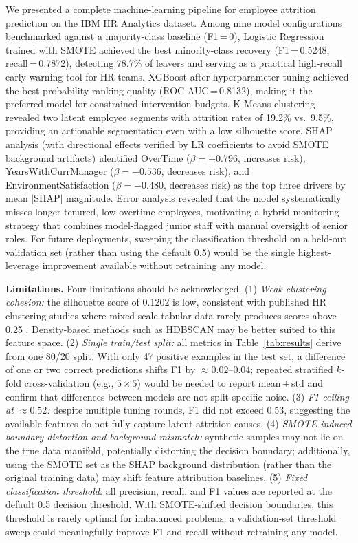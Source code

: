 \documentclass{article}
\begin{document}
We presented a complete machine-learning pipeline for employee attrition
prediction on the IBM HR Analytics dataset. Among nine model configurations
benchmarked against a majority-class baseline (F1\,=\,0), Logistic
Regression trained with SMOTE achieved the best minority-class recovery
(F1\,=\,0.5248, recall\,=\,0.7872), detecting 78.7\% of leavers and
serving as a practical high-recall early-warning tool for HR teams.
XGBoost after hyperparameter tuning achieved the best probability ranking
quality (ROC-AUC\,=\,0.8132), making it the preferred model for
constrained intervention budgets. K-Means clustering revealed two latent
employee segments with attrition rates of 19.2\% vs.\ 9.5\%, providing
an actionable segmentation even with a low silhouette score. SHAP
analysis (with directional effects verified by LR coefficients to avoid
SMOTE background artifacts) identified OverTime ($\beta=+0.796$, increases
risk), YearsWithCurrManager ($\beta=-0.536$, decreases risk), and
EnvironmentSatisfaction ($\beta=-0.480$, decreases risk) as the top three
drivers by mean $|\text{SHAP}|$ magnitude. Error analysis revealed
that the model systematically misses longer-tenured, low-overtime
employees, motivating a hybrid monitoring strategy that combines
model-flagged junior staff with manual oversight of senior roles. For
future deployments, sweeping the classification threshold on a held-out
validation set (rather than using the default 0.5) would be the
single highest-leverage improvement available without retraining any model.

\textbf{Limitations.} Four limitations should be acknowledged.
(1) \textit{Weak clustering cohesion:} the silhouette score of 0.1202
is low, consistent with published HR clustering studies where mixed-scale
tabular data rarely produces scores above 0.25 \citep{jain2018study}.
Density-based methods such as HDBSCAN may be better suited to this
feature space. (2) \textit{Single train/test split:} all metrics in
Table~\ref{tab:results} derive from one 80/20 split. With only 47
positive examples in the test set, a difference of one or two correct
predictions shifts F1 by $\approx 0.02$--$0.04$; repeated stratified
$k$-fold cross-validation (e.g., $5{\times}5$) would be needed to report
mean\,$\pm$\,std and confirm that differences between models are not
split-specific noise. (3) \textit{F1 ceiling at $\approx 0.52$:}
despite multiple tuning rounds, F1 did not exceed 0.53, suggesting the
available features do not fully capture latent attrition causes.
(4) \textit{SMOTE-induced boundary distortion and background mismatch:}
synthetic samples may not lie on the true data manifold, potentially
distorting the decision boundary; additionally, using the SMOTE set as
the SHAP background distribution (rather than the original training data)
may shift feature attribution baselines.
(5) \textit{Fixed classification threshold:} all precision, recall, and
F1 values are reported at the default 0.5 decision threshold. With
SMOTE-shifted decision boundaries, this threshold is rarely optimal for
imbalanced problems; a validation-set threshold sweep could meaningfully
improve F1 and recall without retraining any model.
\end{document}
